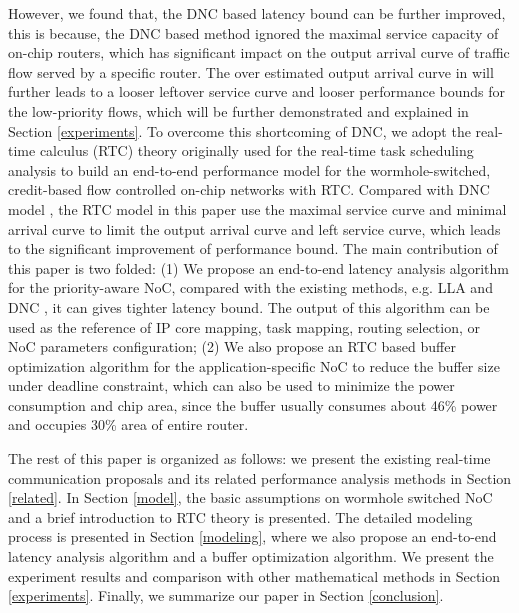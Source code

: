 \documentclass[10pt,journal]{IEEEtran}
\begin{document}
However, we found that, the DNC based latency bound can be further improved, this is because, the DNC based method \cite{Qian489900} ignored the maximal service capacity of on-chip routers, which has significant impact on the output arrival curve of traffic flow served by a specific router. The over estimated output arrival curve in \cite{Qian489900} will further leads to a looser leftover service curve and looser performance bounds for the low-priority flows, which will be further demonstrated and explained in Section \ref{experiments}. To overcome this shortcoming of DNC, we adopt the real-time calculus (RTC) theory \cite{1253607} originally used for the real-time task scheduling analysis to build an end-to-end performance model for the wormhole-switched, credit-based flow controlled on-chip networks with RTC. Compared with DNC model \cite{Qian489900}, the RTC model in this paper use the maximal service curve and minimal arrival curve to limit the output arrival curve and left service curve, which leads to the significant improvement of performance bound. The main contribution of this paper is two folded: (1) We propose an end-to-end latency analysis algorithm for the priority-aware NoC, compared with the existing methods, e.g. LLA \cite{73}\cite{189} and DNC \cite{Qian489900}, it can gives tighter latency bound. The output of this algorithm can be used as the reference of IP core mapping, task mapping, routing selection, or NoC parameters configuration; (2) We also propose an RTC based buffer optimization algorithm for the application-specific NoC to reduce the buffer size under deadline constraint, which can also be used to minimize the power consumption and chip area, since the buffer usually consumes about 46\% power \cite{pkundu} and occupies 30\% area \cite{5507566} of entire router.

The rest of this paper is organized as follows: we present the existing real-time communication proposals and its related performance analysis methods in Section \ref{related}. In Section \ref{model}, the basic assumptions on wormhole switched NoC and a brief introduction to RTC theory is presented. The detailed modeling process is presented in Section \ref{modeling}, where we also propose an end-to-end latency analysis algorithm and a buffer optimization algorithm. We present the experiment results and comparison with other mathematical methods in Section \ref{experiments}. Finally, we summarize our paper in Section \ref{conclusion}.
\end{document}
